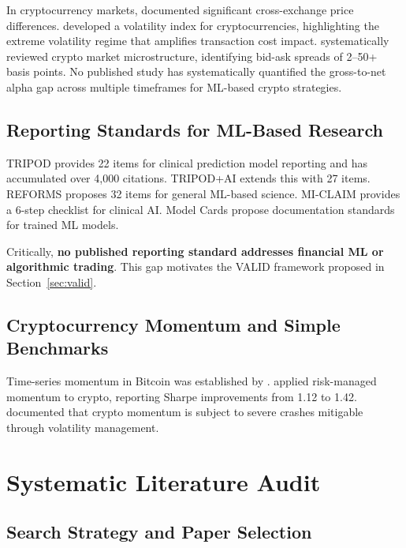 \documentclass[preprint,12pt,authoryear]{elsarticle}
\begin{document}
In cryptocurrency markets, \citet{makarov2020trading} documented significant cross-exchange price differences. \citet{kim2021vcrix} developed a volatility index for cryptocurrencies, highlighting the extreme volatility regime that amplifies transaction cost impact. \citet{almeida2024microstructure} systematically reviewed crypto market microstructure, identifying bid-ask spreads of 2--50+ basis points. No published study has systematically quantified the gross-to-net alpha gap across multiple timeframes for ML-based crypto strategies.

\subsection{Reporting Standards for ML-Based Research}

TRIPOD \citep{collins2015tripod} provides 22 items for clinical prediction model reporting and has accumulated over 4,000 citations. TRIPOD+AI \citep{collins2024tripodai} extends this with 27 items. REFORMS \citep{kapoor2024reforms} proposes 32 items for general ML-based science. MI-CLAIM \citep{norgeot2020mi} provides a 6-step checklist for clinical AI. Model Cards \citep{mitchell2019model} propose documentation standards for trained ML models.

Critically, \textbf{no published reporting standard addresses financial ML or algorithmic trading}. This gap motivates the VALID framework proposed in Section~\ref{sec:valid}.

\subsection{Cryptocurrency Momentum and Simple Benchmarks}

Time-series momentum in Bitcoin was established by \citet{liu2021risks}. \citet{yang2025cryptocurrency} applied risk-managed momentum to crypto, reporting Sharpe improvements from 1.12 to 1.42. \citet{grobys2025momentum} documented that crypto momentum is subject to severe crashes mitigable through volatility management.

\section{Systematic Literature Audit}
\label{sec:audit}

\subsection{Search Strategy and Paper Selection}
\end{document}
